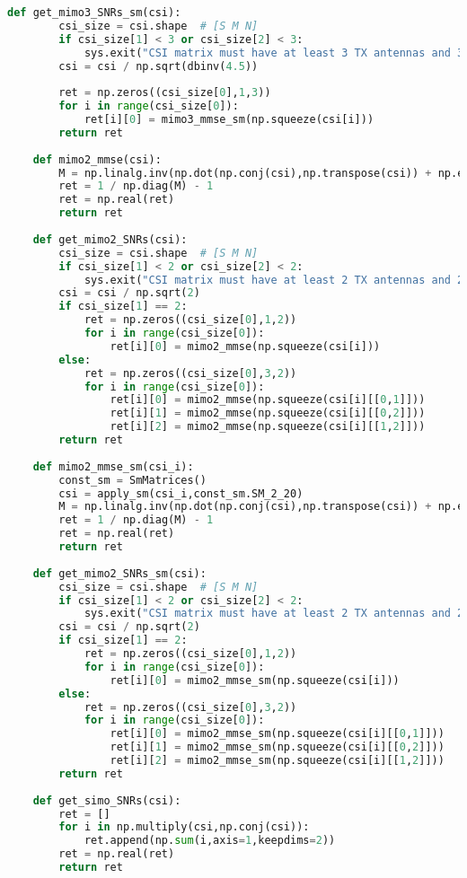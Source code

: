 \documentclass[UTF8]{article}
\begin{document}
\begin{lstlisting}[language=Python, caption=$ get\_SNRs.py $]
    def get_mimo3_SNRs_sm(csi):
        csi_size = csi.shape  # [S M N]
        if csi_size[1] < 3 or csi_size[2] < 3:
            sys.exit("CSI matrix must have at least 3 TX antennas and 3 RX antennas")
        csi = csi / np.sqrt(dbinv(4.5))
    
        ret = np.zeros((csi_size[0],1,3))
        for i in range(csi_size[0]):
            ret[i][0] = mimo3_mmse_sm(np.squeeze(csi[i]))
        return ret
    
    def mimo2_mmse(csi):
        M = np.linalg.inv(np.dot(np.conj(csi),np.transpose(csi)) + np.eye(2))
        ret = 1 / np.diag(M) - 1
        ret = np.real(ret)
        return ret
    
    def get_mimo2_SNRs(csi):
        csi_size = csi.shape  # [S M N]
        if csi_size[1] < 2 or csi_size[2] < 2:
            sys.exit("CSI matrix must have at least 2 TX antennas and 2 RX antennas")
        csi = csi / np.sqrt(2)
        if csi_size[1] == 2:
            ret = np.zeros((csi_size[0],1,2))
            for i in range(csi_size[0]):
                ret[i][0] = mimo2_mmse(np.squeeze(csi[i]))
        else:
            ret = np.zeros((csi_size[0],3,2))
            for i in range(csi_size[0]):
                ret[i][0] = mimo2_mmse(np.squeeze(csi[i][[0,1]]))
                ret[i][1] = mimo2_mmse(np.squeeze(csi[i][[0,2]]))
                ret[i][2] = mimo2_mmse(np.squeeze(csi[i][[1,2]]))
        return ret
    
    def mimo2_mmse_sm(csi_i):
        const_sm = SmMatrices()
        csi = apply_sm(csi_i,const_sm.SM_2_20)
        M = np.linalg.inv(np.dot(np.conj(csi),np.transpose(csi)) + np.eye(2))
        ret = 1 / np.diag(M) - 1
        ret = np.real(ret)
        return ret
    
    def get_mimo2_SNRs_sm(csi):
        csi_size = csi.shape  # [S M N]
        if csi_size[1] < 2 or csi_size[2] < 2:
            sys.exit("CSI matrix must have at least 2 TX antennas and 2 RX antennas")
        csi = csi / np.sqrt(2)
        if csi_size[1] == 2:
            ret = np.zeros((csi_size[0],1,2))
            for i in range(csi_size[0]):
                ret[i][0] = mimo2_mmse_sm(np.squeeze(csi[i]))
        else:
            ret = np.zeros((csi_size[0],3,2))
            for i in range(csi_size[0]):
                ret[i][0] = mimo2_mmse_sm(np.squeeze(csi[i][[0,1]]))
                ret[i][1] = mimo2_mmse_sm(np.squeeze(csi[i][[0,2]]))
                ret[i][2] = mimo2_mmse_sm(np.squeeze(csi[i][[1,2]]))
        return ret
    
    def get_simo_SNRs(csi):
        ret = []
        for i in np.multiply(csi,np.conj(csi)):
            ret.append(np.sum(i,axis=1,keepdims=2))
        ret = np.real(ret)
        return ret
    

\end{lstlisting}
\end{document}
